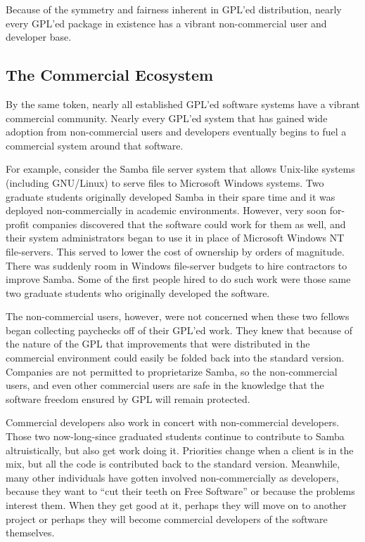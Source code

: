 \documentclass[12pt]{report}
\begin{document}
Because of the symmetry and fairness inherent in GPL'ed distribution,
nearly every GPL'ed package in existence has a vibrant non-commercial user
and developer base.

\subsection{The Commercial Ecosystem}

By the same token, nearly all established GPL'ed software systems have a
vibrant commercial community.  Nearly every GPL'ed system that has gained
wide adoption from non-commercial users and developers eventually begins
to fuel a commercial system around that software.

For example, consider the Samba file server system that allows Unix-like
systems (including GNU/Linux) to serve files to Microsoft Windows systems.
Two graduate students originally developed Samba in their spare time and
it was deployed non-commercially in academic environments.  However, very
soon for-profit companies discovered that the software could work for them
as well, and their system administrators began to use it in place of
Microsoft Windows NT file-servers.  This served to lower the cost of
ownership by orders of magnitude.  There was suddenly room in Windows
file-server budgets to hire contractors to improve Samba.  Some of the first
people hired to do such work were those same two graduate students who
originally developed the software.

The non-commercial users, however, were not concerned when these two
fellows began collecting paychecks off of their GPL'ed work.  They knew
that because of the nature of the GPL that improvements that were
distributed in the commercial environment could easily be folded back into
the standard version.  Companies are not permitted to proprietarize
Samba, so the non-commercial users, and even other commercial users are
safe in the knowledge that the software freedom ensured by GPL will remain
protected.

Commercial developers also work in concert with non-commercial developers.
Those two now-long-since graduated students continue to contribute to
Samba altruistically, but also get work doing it.  Priorities change when a
client is in the mix, but all the code is contributed back to the
standard version.  Meanwhile, many other individuals have gotten involved
non-commercially as developers, because they want to ``cut their teeth on
Free Software'' or because the problems interest them.  When they get good
at it, perhaps they will move on to another project or perhaps they will
become commercial developers of the software themselves.
\end{document}
